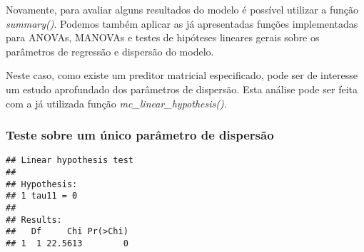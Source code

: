 \begin{knitrout}
\color{fgcolor}\begin{kframe}
\begin{alltt}
 \hlkwb{<-}  \hlopt{~}  \hlopt{*} 
 \hlkwb{<-}  \hlopt{~}  \hlopt{*} 

 \hlkwb{<-} 
 \hlkwb{<-} \hlstd{(}\hlopt{~}  \hlopt{+}   

 \hlkwb{<-} \hlstd{(} \hlstd{=} 
              \hlstd{=} \hlstd{(}
              \hlstd{=} \hlstd{(}\hlstd{,} \hlstd{),}
              \hlstd{=} \hlstd{(}\hlstd{,}
                          \hlstd{),}
              \hlstd{=} \hlstd{(}\hlopt{$}
                           \hlopt{$}
              
\end{alltt}
\end{kframe}
\end{knitrout}

Novamente, para avaliar alguns resultados do modelo é possível utilizar a função \emph{summary()}. Podemos também aplicar as já apresentadas funções implementadas para ANOVAs, MANOVAs e testes de hipóteses lineares gerais sobre os parâmetros de regressão e dispersão do modelo.

Neste caso, como existe um preditor matricial especificado, pode ser de interesse um estudo aprofundado dos parâmetros de dispersão. Esta análise pode ser feita com a já utilizada função \emph{mc\_linear\_hypothesis()}.

\subsubsection{Teste sobre um único parâmetro de dispersão}

\begin{knitrout}
\color{fgcolor}\begin{kframe}
\begin{alltt}
\hlstd{(} 
                      \hlstd{=} \hlstd{(}\hlstd{))}
\end{alltt}
\begin{verbatim}
## Linear hypothesis test
## 
## Hypothesis:           
## 1 tau11 = 0
## 
## Results:
##   Df     Chi Pr(>Chi)
## 1  1 22.5613        0
\end{verbatim}
\end{kframe}
\end{knitrout}

